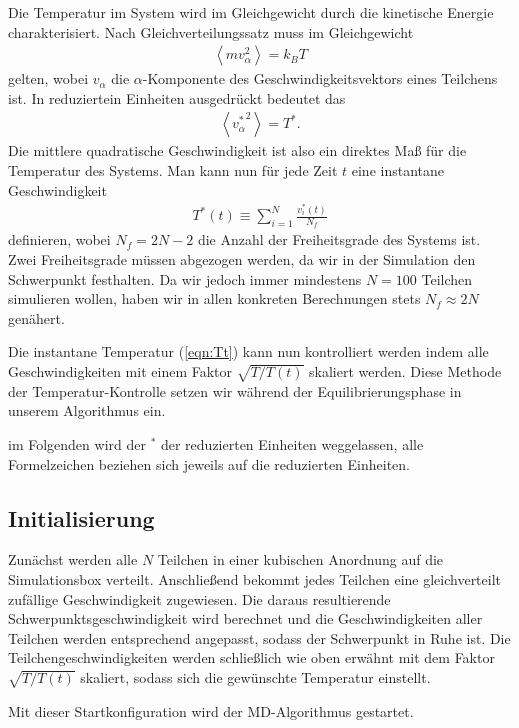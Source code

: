 \documentclass[11pt,a4paper]{article}
\begin{document}
Die Temperatur im System wird im Gleichgewicht durch die kinetische Energie charakterisiert. Nach Gleichverteilungssatz muss im Gleichgewicht 
\begin{align}
	\left\langle m v_{\alpha}^2 \right\rangle = k_B T
\end{align}
gelten, wobei $v_{\alpha}$ die $\alpha$-Komponente des Geschwindigkeitsvektors eines Teilchens ist. In reduziertein Einheiten ausgedrückt bedeutet das
\begin{align}
	\left\langle {v^*_{\alpha}}^2 \right\rangle = T^*.
\end{align}
Die mittlere quadratische Geschwindigkeit ist also ein direktes Maß für die Temperatur des Systems. Man kann nun für jede Zeit $t$ eine instantane Geschwindigkeit 
\begin{align}
	T^*(t) \equiv \sum_{i=1}^{N} \frac{v^*_i(t)}{N_f} \label{eqn:Tt}
\end{align}
definieren, wobei $N_f = 2N - 2$ die Anzahl der Freiheitsgrade des Systems ist. Zwei Freiheitsgrade müssen abgezogen werden, da wir in der Simulation den Schwerpunkt festhalten. Da wir jedoch immer mindestens $N=100$ Teilchen simulieren wollen, haben wir in allen konkreten Berechnungen stets $N_f \approx 2N$ genähert.

Die instantane Temperatur (\ref{eqn:Tt}) kann nun kontrolliert werden indem alle Geschwindigkeiten mit einem Faktor $\sqrt{ T/T(t)}$ skaliert werden. Diese Methode der Temperatur-Kontrolle setzen wir während der Equilibrierungsphase in unserem Algorithmus ein.

im Folgenden wird der $^*$ der reduzierten Einheiten weggelassen, alle Formelzeichen beziehen sich jeweils auf die reduzierten Einheiten.

\subsection{Initialisierung} %
\label{sub:initialisierung}
Zunächst werden alle $N$ Teilchen in einer kubischen Anordnung auf die Simulationsbox verteilt. Anschließend bekommt jedes Teilchen eine gleichverteilt zufällige Geschwindigkeit zugewiesen. Die daraus resultierende Schwerpunktsgeschwindigkeit wird berechnet und die Geschwindigkeiten aller Teilchen werden entsprechend angepasst, sodass der Schwerpunkt in Ruhe ist. Die Teilchengeschwindigkeiten werden schließlich wie oben erwähnt mit dem Faktor $\sqrt{ T/T(t)}$ skaliert, sodass sich die gewünschte Temperatur einstellt.

Mit dieser Startkonfiguration wird der MD-Algorithmus gestartet.
\end{document}
